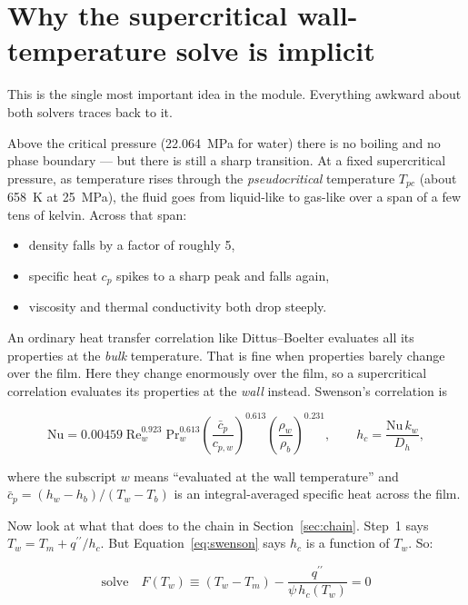 \documentclass[11pt]{article}
\newcommand{\qpp}{q^{\prime\prime}}
\begin{document}
\section{Why the supercritical wall-temperature solve is implicit}
\label{sec:pseudocritical}

This is the single most important idea in the module. Everything awkward about both
solvers traces back to it.

Above the critical pressure (22.064~MPa for water) there is no boiling and no phase
boundary --- but there is still a sharp transition. At a fixed supercritical pressure,
as temperature rises through the \emph{pseudocritical} temperature $T_{pc}$ (about
658~K at 25~MPa), the fluid goes from liquid-like to gas-like over a span of a few tens
of kelvin. Across that span:

\begin{itemize}
\item density falls by a factor of roughly 5,
\item specific heat $c_p$ spikes to a sharp peak and falls again,
\item viscosity and thermal conductivity both drop steeply.
\end{itemize}

An ordinary heat transfer correlation like Dittus--Boelter evaluates all its properties
at the \emph{bulk} temperature. That is fine when properties barely change over the
film. Here they change enormously over the film, so a supercritical correlation
evaluates its properties at the \emph{wall} instead. Swenson's correlation is

\begin{equation}
\mathrm{Nu} = 0.00459\;\mathrm{Re}_w^{0.923}\;\mathrm{Pr}_w^{0.613}
             \left(\frac{\bar c_p}{c_{p,w}}\right)^{0.613}
             \left(\frac{\rho_w}{\rho_b}\right)^{0.231},
\qquad
h_c = \frac{\mathrm{Nu}\,k_w}{D_h},
\label{eq:swenson}
\end{equation}

where the subscript $w$ means ``evaluated at the wall temperature'' and
$\bar c_p = (h_w - h_b)/(T_w - T_b)$ is an integral-averaged specific heat across the
film.

Now look at what that does to the chain in Section~\ref{sec:chain}. Step~1 says
$T_w = T_m + \qpp/h_c$. But Equation~\eqref{eq:swenson} says $h_c$ is a function of
$T_w$. So:

\begin{equation}
\boxed{\;\text{solve}\quad F(T_w) \equiv (T_w - T_m) - \frac{\qpp}{\psi\,h_c(T_w)} = 0\;}
\label{eq:implicit}
\end{equation}
\end{document}
